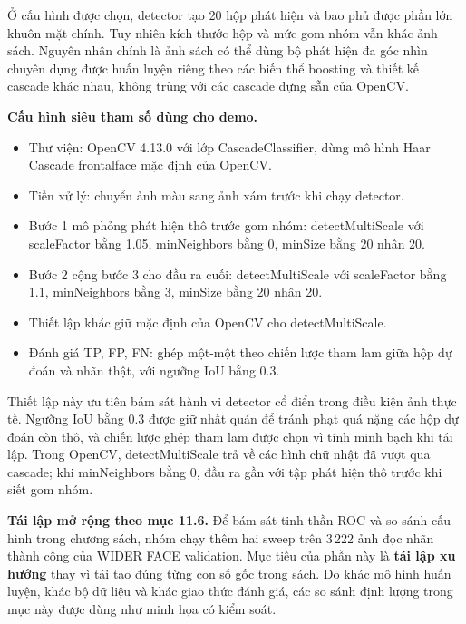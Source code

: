 Ở cấu hình được chọn, detector tạo 20 hộp phát hiện và bao phủ được phần lớn khuôn mặt chính.
Tuy nhiên kích thước hộp và mức gom nhóm vẫn khác ảnh sách.
Nguyên nhân chính là ảnh sách có thể dùng bộ phát hiện đa góc nhìn chuyên dụng được huấn luyện riêng theo các biến thể boosting và thiết kế cascade khác nhau, không trùng với các cascade dựng sẵn của OpenCV. \cite{li2012facechapter}

\textbf{Cấu hình siêu tham số dùng cho demo.}
\begin{itemize}
  \item Thư viện: OpenCV 4.13.0 với lớp CascadeClassifier, dùng mô hình Haar Cascade frontalface mặc định của OpenCV. \cite{bradski2000opencv,opencv_cascade_docs}
  \item Tiền xử lý: chuyển ảnh màu sang ảnh xám trước khi chạy detector.
  \item Bước 1 mô phỏng phát hiện thô trước gom nhóm: detectMultiScale với scaleFactor bằng 1.05, minNeighbors bằng 0, minSize bằng 20 nhân 20.
  \item Bước 2 cộng bước 3 cho đầu ra cuối: detectMultiScale với scaleFactor bằng 1.1, minNeighbors bằng 3, minSize bằng 20 nhân 20.
  \item Thiết lập khác giữ mặc định của OpenCV cho detectMultiScale.
  \item Đánh giá TP, FP, FN: ghép một-một theo chiến lược tham lam giữa hộp dự đoán và nhãn thật, với ngưỡng IoU bằng 0.3.
\end{itemize}
Thiết lập này ưu tiên bám sát hành vi detector cổ điển trong điều kiện ảnh thực tế.
Ngưỡng IoU bằng 0.3 được giữ nhất quán để tránh phạt quá nặng các hộp dự đoán còn thô, và chiến lược ghép tham lam được chọn vì tính minh bạch khi tái lập.
Trong OpenCV, detectMultiScale trả về các hình chữ nhật đã vượt qua cascade; khi minNeighbors bằng 0, đầu ra gần với tập phát hiện thô trước khi siết gom nhóm.

\textbf{Tái lập mở rộng theo mục 11.6.}
Để bám sát tinh thần ROC và so sánh cấu hình trong chương sách, nhóm chạy thêm hai sweep trên 3\,222 ảnh đọc nhãn thành công của WIDER FACE validation.
Mục tiêu của phần này là \textbf{tái lập xu hướng} thay vì tái tạo đúng từng con số gốc trong sách.
Do khác mô hình huấn luyện, khác bộ dữ liệu và khác giao thức đánh giá, các so sánh định lượng trong mục này được dùng như minh họa có kiểm soát.

